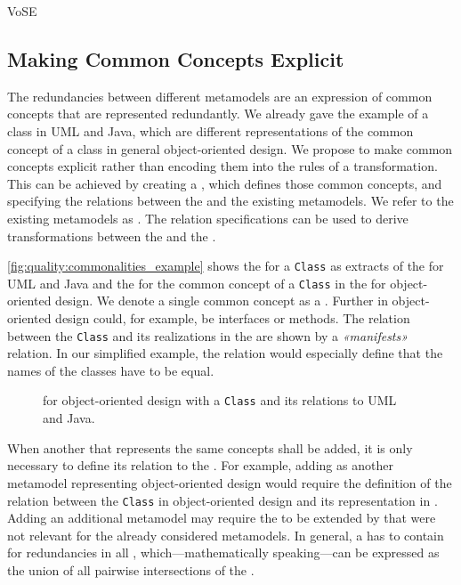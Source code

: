 \begin{copiedFrom}{VoSE}
\subsection{Making Common Concepts Explicit}

The redundancies between different metamodels are an expression of common concepts that are represented redundantly.
We already gave the example of a class in UML and Java, which are different representations of the common concept of a class in general object-oriented design.
We propose to make common concepts explicit rather than encoding them into the rules of a transformation.
This can be achieved by creating a \emph{\conceptmetamodel}, which defines those common concepts, and specifying the relations between the \conceptmetamodel and the existing metamodels.
We refer to the existing metamodels as \emph{\concretemetamodels}.
The relation specifications can be used to derive transformations between the \concretemetamodels and the \conceptmetamodel.

\autoref{fig:quality:commonalities_example} shows the \metaclasses for a \texttt{Class} as extracts of the \concretemetamodels for UML and Java and the \metaclass for the common concept of a \texttt{Class} in the \conceptmetamodel for object-oriented design.
We denote a single common concept as a \emph{\commonality}.
Further \commonalities in object-oriented design could, for example, be interfaces or methods.
The relation between the \texttt{Class} \commonality and its realizations in the \concretemetamodels are shown by a \emph{«manifests»} relation.
In our simplified example, the relation would especially define that the names of the classes have to be equal. %

\begin{figure}
    \centering
    
    \caption[Concept metamodel for object-oriented design]{\Conceptmetamodel for object-oriented design with a \texttt{Class} \commonality and its relations to UML and Java.}
    \label{fig:quality:commonalities_example}
\end{figure}

When another \concretemetamodel that represents the same concepts shall be added, it is only necessary to define its relation to the \conceptmetamodel.
For example, adding \cplusplus as another metamodel representing object-oriented design would require the definition of the relation between the \texttt{Class} \commonality in object-oriented design and its representation in \cplusplus.
Adding an additional metamodel may require the \conceptmetamodel to be extended by \commonalities that were not relevant for the already considered metamodels.
In general, a \conceptmetamodel has to contain \commonalities for redundancies in all \concretemetamodels, which---mathematically speaking---can be expressed as the union of all pairwise intersections of the \concretemetamodels.


\end{copiedFrom}
